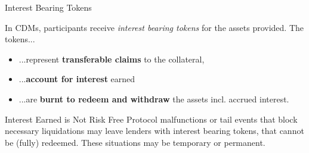 \documentclass[handout]{beamer}
\begin{document}
\begin{frame}{Interest Bearing Tokens}

In CDMs, participants receive \emph{interest bearing tokens} for the assets provided. The tokens...
\vspace{0.5em}
\begin{itemize}
  \item ...represent \textbf{transferable claims} to the collateral,
  \item ...\textbf{account for interest} earned
  \item ...are \textbf{burnt to redeem and withdraw} the assets incl. accrued interest.
\end{itemize}

 {
\vspace{1.0em}
\begin{keytakeaway}{Interest Earned is Not Risk Free}
	Protocol malfunctions or tail events that block necessary liquidations may leave lenders with interest bearing tokens, that cannot be (fully) redeemed. These situations may be temporary or permanent.
\end{keytakeaway}
}

\end{frame}
\end{document}
